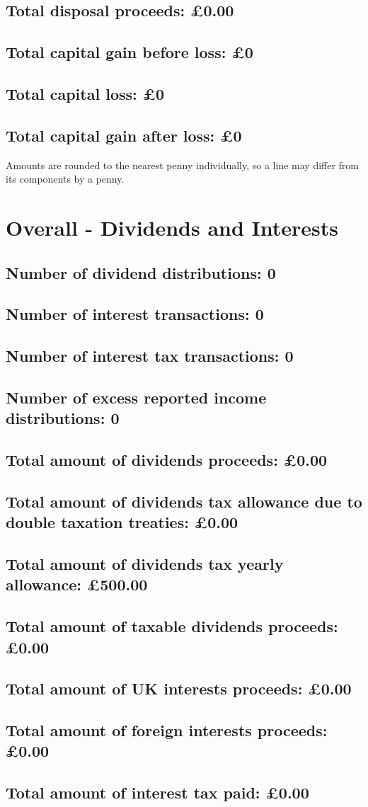 \documentclass{article}
\begin{document}
\subsection*{Total disposal proceeds: £0.00}
\subsection*{Total capital gain before loss: £0}
\subsection*{Total capital loss: £0}
\subsection*{Total capital gain after loss: £0}
\vspace{1em}
Amounts are rounded to the nearest penny individually, so a line may differ from its components by a penny.
\vspace{2em}
\section*{Overall - Dividends and Interests}
\subsection*{Number of dividend distributions: 0}
\subsection*{Number of interest transactions: 0}
\subsection*{Number of interest tax transactions: 0}
\subsection*{Number of excess reported income distributions: 0}
\subsection*{Total amount of dividends proceeds: £0.00}
\subsection*{Total amount of dividends tax allowance due to double taxation treaties: £0.00}
\subsection*{Total amount of dividends tax yearly allowance: £500.00}
\subsection*{Total amount of taxable dividends proceeds: £0.00}
\subsection*{Total amount of UK interests proceeds: £0.00}
\subsection*{Total amount of foreign interests proceeds: £0.00}
\subsection*{Total amount of interest tax paid: £0.00}
\end{document}
